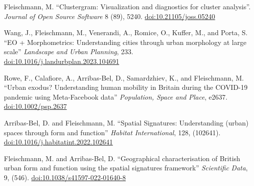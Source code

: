 \documentclass[11pt,a4paper]{report}
\begin{document}
\begin{tablist}

        \item[2023] \tab{}Fleischmann, M. \enquote{Clustergram: Visualization and diagnostics for cluster analysis}. \textit{Journal of Open Source Software} 8 (89), 5240. \href{https://doi.org/10.21105/joss.05240}{doi:10.21105/joss.05240}

        \item[2023] \tab{}Wang, J., Fleischmann, M., Venerandi, A., Romice, O., Kuffer, M., and Porta, S. \enquote{EO + Morphometrics: Understanding cities through urban morphology at large scale} \textit{Landscape and Urban Planning}, 233. \href{https://doi.org/10.1016/j.landurbplan.2023.104691}{doi:10.1016/j.landurbplan.2023.104691}

        \item[2022] \tab{}Rowe, F., Calafiore, A., Arribas-Bel, D., Samardzhiev, K., and Fleischmann, M. \enquote{Urban exodus? Understanding human mobility in Britain during the COVID-19 pandemic using Meta-Facebook data} \textit{Population, Space and Place}, e2637. \href{https://doi.org/10.1002/psp.2637}{doi:10.1002/psp.2637}

        \item[2022] \tab{}Arribas-Bel, D. and Fleischmann, M. \enquote{Spatial Signatures: Understanding (urban) spaces through form and function} \textit{Habitat International}, 128, (102641). \href{https://doi.org/10.1016/j.habitatint.2022.102641}{doi:10.1016/j.habitatint.2022.102641}

        \item[2022] \tab{}Fleischmann, M. and Arribas-Bel, D. \enquote{Geographical characterisation of British urban form and function using the spatial signatures framework} \textit{Scientific Data}, 9, (546). \href{https://doi.org/10.1038/s41597-022-01640-8}{doi:10.1038/s41597-022-01640-8}



\end{tablist}
\end{document}
